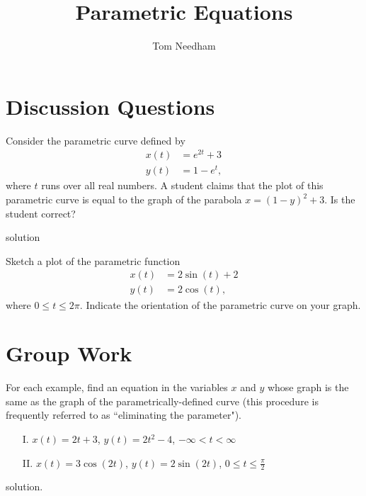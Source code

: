 \documentclass[handout]{ximera}
\author{Tom Needham}
\title[Collaborate:]{Parametric Equations}
\begin{document}
\begin{abstract}
\end{abstract}
\maketitle

\section{Discussion Questions}

\begin{problem}
Consider the parametric curve defined by 
\begin{align*}
x(t) &= e^{2t} + 3 \\
y(t) &= 1-e^t,
\end{align*}
where $t$ runs over all real numbers. A student claims that the plot of this parametric curve is equal to the graph of the parabola $x = (1-y)^2 + 3$. Is the student correct?
\begin{solution}
solution
\end{solution}
\end{problem}

\begin{problem}
Sketch a plot of the parametric function
\begin{align*}
x(t) &= 2 \sin (t) +2\\
y(t) &= 2 \cos (t),
\end{align*}
where $0 \leq t \leq 2\pi$. Indicate the orientation of the parametric curve on your graph.
\end{problem}


\section{Group Work}

\begin{problem}
For each example, find an equation in the variables $x$ and $y$ whose graph is the same as the graph of the parametrically-defined curve (this procedure is frequently referred to as ``eliminating the parameter").

\begin{itemize}
\item[I.] $x(t) = 2t+3$, $y(t)=2t^2-4$, $-\infty < t < \infty$  
\item[II.] $x(t) = 3 \cos (2t)$, $y(t) = 2 \sin(2t)$, $0 \leq t \leq \frac{\pi}{2}$
\end{itemize}
\begin{solution}
solution.
\end{solution}
\end{problem}
\end{document}
